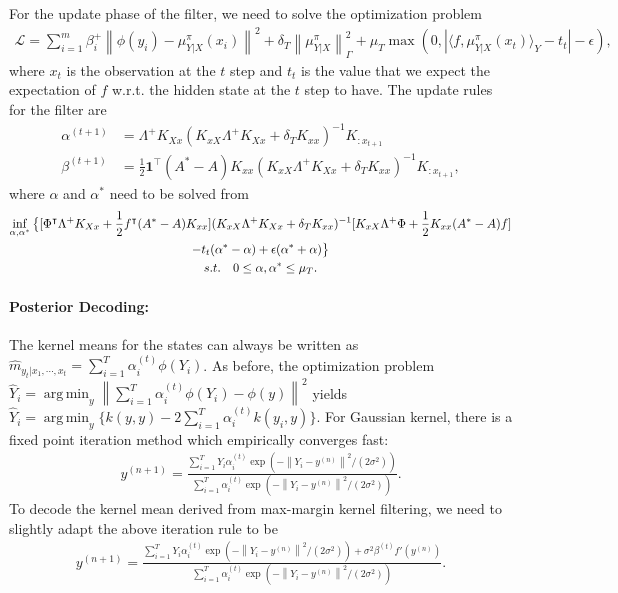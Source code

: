 \documentclass[a4paper]{article}
\renewcommand{\bf}{\mathbf}
\renewcommand{\cal}{\mathcal}
\newcommand{\norm}[1]{\left\lVert#1\right\rVert}
\newcommand{\T}{\intercal}
\DeclareMathOperator*{\argmin}{arg\,min}
\begin{document}
For the update phase of the filter, we need to solve the optimization problem
\begin{align}
\cal{L} = \sum_{i=1}^{m} \beta_i^+ \norm{\phi(y_i) - \mu_{Y|X}^\pi(x_i)}^2 + \delta_T\norm{\mu_{Y|X}^\pi}_\Gamma^2 + \mu_T \max (0, |\langle f, \mu_{Y|X}^\pi(x_t)\rangle_{Y} - t_t| - \epsilon),
\end{align}
where $x_t$ is the observation at the $t$ step and $t_t$ is the value that we expect the expectation of $f$ w.r.t. the hidden state at the $t$ step to have.
The update rules for the filter are
\begin{align}
\alpha^{(t+1)} &= \Lambda^+ K_{Xx}(K_{xX}\Lambda^+K_{Xx}+\delta_T K_{xx})^{-1}K_{:x_{t+1}}\\
\beta^{(t+1)} &= \frac{1}{2} \bf{1}^\T (A^*-A) K_{xx}(K_{xX}\Lambda^+K_{Xx}+\delta_T K_{xx})^{-1}K_{:x_{t+1}},
\end{align}
where $\alpha$ and $\alpha^*$ need to be solved from
\begin{gather}
\inf_{\alpha,\alpha^*} \big\{ [\Phi^\T \Lambda^+ K_{Xx} + \frac{1}{2} f^\T (A^* - A)K_{xx}](K_{xX}\Lambda^+ K_{Xx} +\delta_T K_{xx})^{-1}[K_{xX}\Lambda^+\Phi + \frac{1}{2} K_{xx} (A^* - A)f]\notag\\- t_t(\alpha^* - \alpha) + \epsilon  (\alpha^* + \alpha)\big\}\\
 s.t.\quad 0 \leq \alpha,\alpha^* \leq \mu_T.\notag
\end{gather}

\paragraph{Posterior Decoding:} The kernel means for the states can always be written as $\hat{m}_{y_t|x_1,\cdots,x_t} = \sum_{i=1}^T \alpha_i^{(t)}\phi(Y_i)$. As before, the optimization problem $\hat{Y}_i = \argmin_{y}\norm{\sum_{i=1}^T \alpha_i^{(t)}\phi(Y_i) - \phi(y)}^2$ yields $\hat{Y}_i = \argmin_y \{ k(y,y) - 2\sum_{i=1}^T \alpha_i^{(t)}k(y_i,y)\}$. For Gaussian kernel, there is a fixed point iteration method which empirically converges fast:
\begin{align}
y^{(n+1)} = \frac{\sum_{i=1}^T Y_i \alpha_i^{(t)}\exp(-\norm{Y_i-y^{(n)}}^2/(2\sigma^2))}{\sum_{i=1}^T \alpha_i^{(t)}\exp(-\norm{Y_i-y^{(n)}}^2/(2\sigma^2))}.
\end{align}
To decode the kernel mean derived from max-margin kernel filtering, we need to slightly adapt the above iteration rule to be
\begin{align}
y^{(n+1)} = \frac{\sum_{i=1}^T Y_i\alpha_i^{(t)}\exp(-\norm{Y_i-y^{(n)}}^2/(2\sigma^2)) + \sigma^2 \beta^{(t)} f'(y^{(n)}) }{\sum_{i=1}^T\alpha_i^{(t)} \exp(-\norm{Y_i-y^{(n)}}^2/(2\sigma^2))}.
\end{align}

\end{document}
